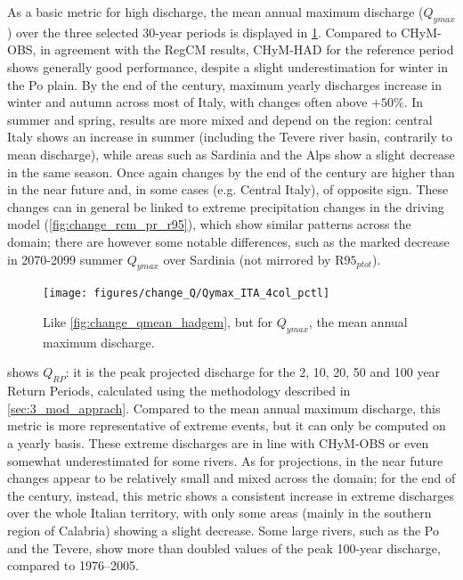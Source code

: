 As a basic metric for high discharge, the mean annual maximum discharge ($Q_{ymax}$) over the three selected 30-year periods is displayed in \cref{fig:change_qymax_hadgem}.
Compared to CHyM-OBS, in agreement with the RegCM results, CHyM-HAD for the reference period shows generally good performance, despite a slight underestimation for winter in the Po plain.
By the end of the century, maximum yearly discharges increase in winter and autumn across most of Italy, with changes often above $+50\%$.
In summer and spring, results are more mixed and depend on the region: central Italy shows an increase in summer (including the Tevere river basin, contrarily to mean discharge), while areas such as Sardinia and the Alps show a slight decrease in the same season.
Once again changes by the end of the century are higher than in the near future and, in some cases (e.g. Central Italy), of opposite sign.
These changes can in general be linked to extreme precipitation changes in the driving model (\cref{fig:change_rcm_pr_r95}), which show similar patterns across the domain; there are however some notable differences, such as the marked decrease in 2070-2099 summer $Q_{ymax}$ over Sardinia (not mirrored by $\textrm{R95}_{ptot}$).\\
\begin{figure}
    \centering
    \texttt{[image: figures/change\_Q/Qymax\_ITA\_4col\_pctl]}
    \decoRule
    \caption[Mean annual maximum discharge change in CHyM (HadGEM)]{
        Like \cref{fig:change_qmean_hadgem}, but for $Q_{ymax}$, the mean annual maximum discharge.
    } \label{fig:change_qymax_hadgem}
\end{figure}
 shows $Q_{RP}$: it is the peak projected discharge for the 2, 10, 20, 50 and 100 year Return Periods, calculated using the methodology described in \cref{sec:3_mod_apprach}.
Compared to the mean annual maximum discharge, this metric is more representative of extreme events, but it can only be computed on a yearly basis.
These extreme discharges are in line with CHyM-OBS or even somewhat underestimated for some rivers.
As for projections, in the near future changes appear to be relatively small and mixed across the domain; for the end of the century, instead, this metric shows a consistent increase in extreme discharges over the whole Italian territory, with only some areas (mainly in the southern region of Calabria) showing a slight decrease.
Some large rivers, such as the Po and the Tevere, show more than doubled values of the peak 100-year discharge, compared to 1976--2005.

